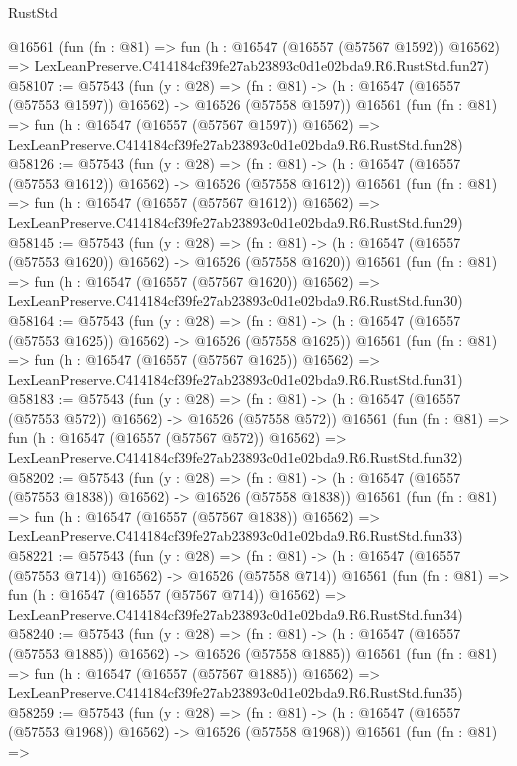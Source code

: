 \begin{lexlean}{RustStd}
\begin{coremodule}
    @16561
    (fun (fn : @81) =>
    fun (h : @16547 (@16557 (@57567 @1592)) @16562) =>
    LexLeanPreserve.C414184cf39fe27ab23893c0d1e02bda9.R6.RustStd.fun27)
@58107 := @57543
    (fun (y : @28) =>
    (fn : @81) -> (h : @16547 (@16557 (@57553 @1597)) @16562) -> @16526 (@57558 @1597))
    @16561
    (fun (fn : @81) =>
    fun (h : @16547 (@16557 (@57567 @1597)) @16562) =>
    LexLeanPreserve.C414184cf39fe27ab23893c0d1e02bda9.R6.RustStd.fun28)
@58126 := @57543
    (fun (y : @28) =>
    (fn : @81) -> (h : @16547 (@16557 (@57553 @1612)) @16562) -> @16526 (@57558 @1612))
    @16561
    (fun (fn : @81) =>
    fun (h : @16547 (@16557 (@57567 @1612)) @16562) =>
    LexLeanPreserve.C414184cf39fe27ab23893c0d1e02bda9.R6.RustStd.fun29)
@58145 := @57543
    (fun (y : @28) =>
    (fn : @81) -> (h : @16547 (@16557 (@57553 @1620)) @16562) -> @16526 (@57558 @1620))
    @16561
    (fun (fn : @81) =>
    fun (h : @16547 (@16557 (@57567 @1620)) @16562) =>
    LexLeanPreserve.C414184cf39fe27ab23893c0d1e02bda9.R6.RustStd.fun30)
@58164 := @57543
    (fun (y : @28) =>
    (fn : @81) -> (h : @16547 (@16557 (@57553 @1625)) @16562) -> @16526 (@57558 @1625))
    @16561
    (fun (fn : @81) =>
    fun (h : @16547 (@16557 (@57567 @1625)) @16562) =>
    LexLeanPreserve.C414184cf39fe27ab23893c0d1e02bda9.R6.RustStd.fun31)
@58183 := @57543
    (fun (y : @28) =>
    (fn : @81) -> (h : @16547 (@16557 (@57553 @572)) @16562) -> @16526 (@57558 @572))
    @16561
    (fun (fn : @81) =>
    fun (h : @16547 (@16557 (@57567 @572)) @16562) =>
    LexLeanPreserve.C414184cf39fe27ab23893c0d1e02bda9.R6.RustStd.fun32)
@58202 := @57543
    (fun (y : @28) =>
    (fn : @81) -> (h : @16547 (@16557 (@57553 @1838)) @16562) -> @16526 (@57558 @1838))
    @16561
    (fun (fn : @81) =>
    fun (h : @16547 (@16557 (@57567 @1838)) @16562) =>
    LexLeanPreserve.C414184cf39fe27ab23893c0d1e02bda9.R6.RustStd.fun33)
@58221 := @57543
    (fun (y : @28) =>
    (fn : @81) -> (h : @16547 (@16557 (@57553 @714)) @16562) -> @16526 (@57558 @714))
    @16561
    (fun (fn : @81) =>
    fun (h : @16547 (@16557 (@57567 @714)) @16562) =>
    LexLeanPreserve.C414184cf39fe27ab23893c0d1e02bda9.R6.RustStd.fun34)
@58240 := @57543
    (fun (y : @28) =>
    (fn : @81) -> (h : @16547 (@16557 (@57553 @1885)) @16562) -> @16526 (@57558 @1885))
    @16561
    (fun (fn : @81) =>
    fun (h : @16547 (@16557 (@57567 @1885)) @16562) =>
    LexLeanPreserve.C414184cf39fe27ab23893c0d1e02bda9.R6.RustStd.fun35)
@58259 := @57543
    (fun (y : @28) =>
    (fn : @81) -> (h : @16547 (@16557 (@57553 @1968)) @16562) -> @16526 (@57558 @1968))
    @16561
    (fun (fn : @81) =>

\end{coremodule}
\end{lexlean}
